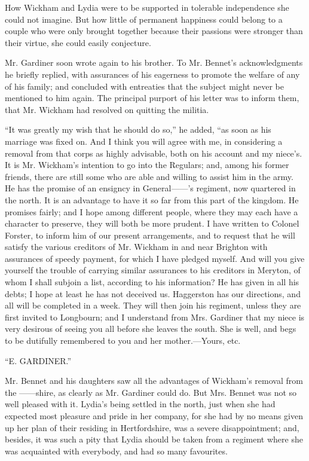 How Wickham and Lydia were to be supported in tolerable independence she could not imagine. But how little of permanent happiness could belong to a couple who were only brought together because their passions were stronger than their virtue, she could easily conjecture.

Mr. Gardiner soon wrote again to his brother. To Mr. Bennet's acknowledgments he briefly replied, with assurances of his eagerness to promote the welfare of any of his family; and concluded with entreaties that the subject might never be mentioned to him again. The principal purport of his letter was to inform them, that Mr. Wickham had resolved on quitting the militia.

``It was greatly my wish that he should do so,'' he added, ``as soon as his marriage was fixed on. And I think you will agree with me, in considering a removal from that corps as highly advisable, both on his account and my niece's. It is Mr. Wickham's intention to go into the Regulars; and, among his former friends, there are still some who are able and willing to assist him in the army. He has the promise of an ensigncy in General------'s regiment, now quartered in the north. It is an advantage to have it so far from this part of the kingdom. He promises fairly; and I hope among different people, where they may each have a character to preserve, they will both be more prudent. I have written to Colonel Forster, to inform him of our present arrangements, and to request that he will satisfy the various creditors of Mr. Wickham in and near Brighton with assurances of speedy payment, for which I have pledged myself. And will you give yourself the trouble of carrying similar assurances to his creditors in Meryton, of whom I shall subjoin a list, according to his information? He has given in all his debts; I hope at least he has not deceived us. Haggerston has our directions, and all will be completed in a week. They will then join his regiment, unless they are first invited to Longbourn; and I understand from Mrs. Gardiner that my niece is very desirous of seeing you all before she leaves the south. She is well, and begs to be dutifully remembered to you and her mother.---Yours, etc.

``E. GARDINER.''

Mr. Bennet and his daughters saw all the advantages of Wickham's removal from the ------shire, as clearly as Mr. Gardiner could do. But Mrs. Bennet was not so well pleased with it. Lydia's being settled in the north, just when she had expected most pleasure and pride in her company, for she had by no means given up her plan of their residing in Hertfordshire, was a severe disappointment; and, besides, it was such a pity that Lydia should be taken from a regiment where she was acquainted with everybody, and had so many favourites.

